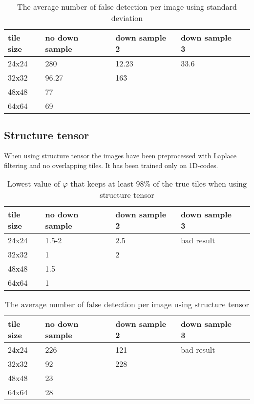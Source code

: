 \begin{table}[H]
\begin{center}
     \begin{tabular}{ | l | l | l | l | l |}
     \hline
     tile size & no down sample & down sample 2 & down sample 3 \\ \hline
   	 24x24 & 280 & 12.23 & 33.6 	\\ \hline
     32x32 & 96.27 & 163 & 			\\ \hline
     48x48 & 77    &     &  		\\ \hline
     64x64 & 69     &     &			\\ \hline
     \end{tabular}
\end{center}
\caption{The average number of false detection per image using standard deviation}
\end{table}

\subsection{Structure tensor}
When using structure tensor the images have been preprocessed with Laplace filtering and no overlapping tiles. It has been trained only on 1D-codes. 

\begin{table}[H]
\begin{center}
     \begin{tabular}{ | l | l | l | l | l |}
     \hline
     tile size & no down sample & down sample 2 & down sample 3 \\ \hline
   	 24x24 & 1.5-2 & 2.5 & bad result 	\\ \hline
     32x32 & 1 & 2  & 					\\ \hline
     48x48 & 1.5 &     &  				\\ \hline
     64x64 & 1 &     &					\\ \hline
     \end{tabular}
\end{center}
\caption{Lowest value of $\varphi$ that keeps at least 98\% of the true tiles when using structure tensor}
\end{table}

\begin{table}[H]
\begin{center}
     \begin{tabular}{ | l | l | l | l | l |}
     \hline
     tile size & no down sample & down sample 2 & down sample 3 \\ \hline
   	 24x24 & 226 & 121 & bad result 	\\ \hline
     32x32 & 92 & 228 & 				\\ \hline
     48x48 & 23    &     &  			\\ \hline
     64x64 & 28     &     &				\\ \hline
     \end{tabular}
\end{center}
\caption{The average number of false detection per image using structure tensor}
\end{table}

